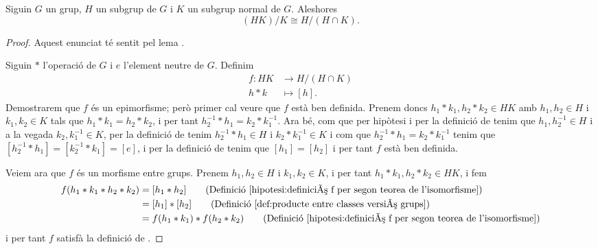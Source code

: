 \documentclass[../../Main.tex]{subfiles}
\begin{document}
	\begin{theorem}
		\label{thm:Segon Teorema de l'isomorfisme entre grups}
		Siguin \(G\) un grup, \(H\) un subgrup de \(G\) i \(K\) un subgrup normal de \(G\). Aleshores
		\[(HK)/K\cong H/(H\cap K).\]
		\begin{proof}
			Aquest enunciat té sentit pel lema .
			
			Siguin \(\ast\) l'operació de \(G\) i \(e\) l'element neutre de \(G\). Definim
			\begin{align}\label{hipotesi:definició f per segon teorea de l'isomorfisme}
			f\colon HK&\longrightarrow H/(H\cap K)\\
			h\ast k&\longmapsto [h].\nonumber
			\end{align}
			Demostrarem que \(f\) és un epimorfisme; però primer cal veure que \(f\) està ben definida. Prenem doncs \(h_{1}\ast k_{1},h_{2}\ast k_{2}\in HK\) amb \(h_{1},h_{2}\in H\) i \(k_{1},k_{2}\in K\) tals que \(h_{1}\ast k_{1}=h_{2}\ast k_{2}\), i per tant \(h_{2}^{-1}\ast h_{1}=k_{2}\ast k_{1}^{-1}\). Ara bé, com que per hipòtesi i per la definició de  tenim que \(h_{1},h_{2}^{-1}\in H\) i a la vegada \(k_{2},k_{1}^{-1}\in K\), per la definició de  tenim \(h_{2}^{-1}\ast h_{1}\in H\) i \(k_{2}\ast k_{1}^{-1}\in K\) i com que \(h_{2}^{-1}\ast h_{1}=k_{2}\ast k_{1}^{-1}\) tenim que \([h_{2}^{-1}\ast h_{1}]=[k_{2}^{-1}\ast k_{1}]=[e]\), i per la definició de  %
			tenim que \([h_{1}]=[h_{2}]\) i per tant \(f\) està ben definida.
			
			Veiem ara que \(f\) és un morfisme entre grups. Prenem \(h_{1},h_{2}\in H\) i \(k_{1},k_{2}\in K\), i per tant \(h_{1}\ast k_{1},h_{2}\ast k_{2}\in HK\), i fem
			\begin{align*}
			f(h_{1}\ast k_{1}\ast h_{2}\ast k_{2})&=[h_{1}\ast h_{2}]\tag{Definició \eqref{hipotesi:definició f per segon teorea de l'isomorfisme}}\\
			&=[h_{1}]\ast[h_{2}]\tag{Definició \eqref{def:producte entre classes versió grups}}\\
			&=f(h_{1}\ast k_{1})\ast f(h_{2}\ast k_{2})\tag{Definició \eqref{hipotesi:definició f per segon teorea de l'isomorfisme}}
			\end{align*}
			i per tant \(f\) satisfà la definició de .
			

\end{proof}
\end{theorem}
\end{document}
